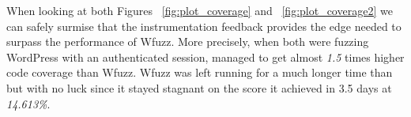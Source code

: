 When looking at both Figures ~\ref{fig:plot_coverage} and ~\ref{fig:plot_coverage2} we can safely surmise that the instrumentation feedback provides \pname{} the edge needed to surpass the performance of Wfuzz. More precisely, when both were fuzzing WordPress with an authenticated session, \pname{} managed to get almost \emph{1.5} times higher code coverage than Wfuzz. Wfuzz was left running for a much longer time than \pname{} but with no luck since it stayed stagnant on the score it achieved in 3.5 days at \emph{14.613\%}.